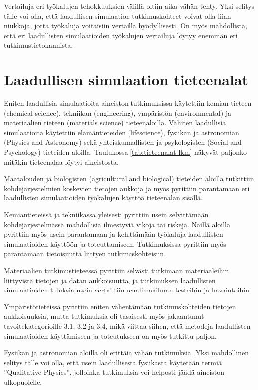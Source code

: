 \documentclass[utf8]{gradu3}
\begin{document}
Vertailuja eri työkalujen tehokkuuksien välillä oltiin aika vähän tehty. 
Yksi selitys tälle voi olla, että laadullisen simulaation tutkimuskohteet 
voivat olla liian niukkoja, jotta työkaluja voitaisiin vertailla hyödyllisesti.
On myös mahdollista, että eri laadullisten simulaatioiden työkalujen vertailuja 
löytyy enemmän eri tutkimustietokannista.

\section{Laadullisen simulaation tieteenalat}
Eniten laadullisia simulaatioita aineiston tutkimuksissa
käytettiin kemian tieteen (chemical science),
tekniikan (engineering), ympäristön (environmental) ja materiaalien tieteen  (materials science) tieteenaloilla. 
Vähiten laadullisia simulaatioita käytettiin elämäntieteiden (lifescience),
fysiikan ja astronomian  (Physics and Astronomy) sekä 
yhteiskunnallisten ja psykologisten (Social and Psychology) tieteiden aloilla.
Taulukossa \ref{tab:tieteenalat lkm} näkyvät paljonko mitäkin tieteenalaa
löytyi aineistosta.

Maatalouden ja biologisten (agricultural and biological) tieteiden aloilla
tutkittiin kohdejärjestelmien koskevien tietojen aukkoja ja myös pyrittiin
parantamaan eri laadullisten simulaatioiden työkalujen käyttöä tieteenalan
sisällä.

Kemiantieteissä ja tekniikassa yleisesti 
pyrittiin usein selvittämään kohdejärjestelmässä mahdollisia 
ilmestyviä vikoja tai riskejä.
Näillä aloilla pyrittiin myös usein parantamaan ja 
kehittämään työkaluja laadullisten simulaatioiden käyttöön ja toteuttamiseen.
Tutkimuksissa pyrittiin myös parantamaan tietoisuutta liittyen tutkimuskohteisiin.

Materiaalien tutkimustieteessä pyrittiin selvästi 
tutkimaan materiaaleihin  liittyvistä tietojen ja datan aukkoisuutta, 
ja tutkimuksen laadullisten simulaatioiden tuloksia usein vertailtiin reaalimaailman testeihin ja havaintoihin.

Ympäristötieteissä pyrittiin eniten vähentämään tutkimuskohteiden tietojen aukkoisuuksia, mutta tutkimuksia oli tasaisesti myös jakaantunut tavoitekategorioille 3.1, 3.2 ja 3.4, mikä viittaa siihen, että
metodeja laadullisten simulaatioiden käyttämiseen ja toteutukseen on myös
tutkittu paljon.

Fysiikan ja astronomian aloilla oli erittäin vähän tutkimuksia.
Yksi mahdollinen selitys tälle voi olla,
että usein laadullisesta fysiikasta käytetään termiä ''Qualitative Physics'', jolloinka tutkimuksia voi helposti jäädä aineiston ulkopuolelle.
\end{document}
